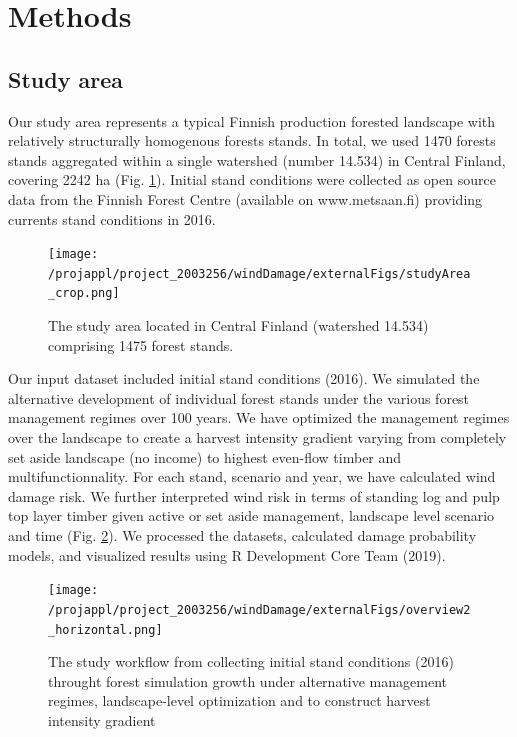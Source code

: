 \documentclass[]{elsarticle} %
\begin{document}
\hypertarget{methods}{%
\section{Methods}\label{methods}}

\hypertarget{study-area}{%
\subsection{Study area}\label{study-area}}

Our study area represents a typical Finnish production forested landscape with relatively structurally homogenous forests stands. In total, we used 1470 forests stands aggregated within a single watershed (number 14.534) in Central Finland, covering 2242 ha (Fig. \ref{study_area}). Initial stand conditions were collected as open source data from the Finnish Forest Centre (available on www.metsaan.fi) providing currents stand conditions in 2016.

\begin{figure}
\centering
\texttt{[image: /projappl/project\_2003256/windDamage/externalFigs/studyArea\_crop.png]}
\caption{The study area located in Central Finland (watershed 14.534) comprising 1475 forest stands.\label{study_area}}
\end{figure}

Our input dataset included initial stand conditions (2016). We simulated the alternative development of individual forest stands under the various forest management regimes over 100 years. We have optimized the management regimes over the landscape to create a harvest intensity gradient varying from completely set aside landscape (no income) to highest even-flow timber and multifunctionnality. For each stand, scenario and year, we have calculated wind damage risk. We further interpreted wind risk in terms of standing log and pulp top layer timber given active or set aside management, landscape level scenario and time (Fig. \ref{workflow}). We processed the datasets, calculated damage probability models, and visualized results using R Development Core Team (2019).

\begin{figure}
\centering
\texttt{[image: /projappl/project\_2003256/windDamage/externalFigs/overview2\_horizontal.png]}
\caption{The study workflow from collecting initial stand conditions (2016) throught forest simulation growth under alternative management regimes, landscape-level optimization and to construct harvest intensity gradient \label{workflow}}
\end{figure}
\end{document}
